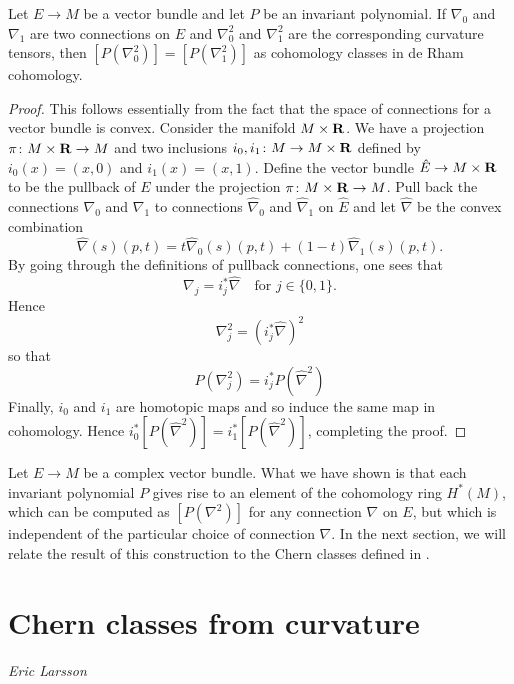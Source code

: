 \documentclass[a4paper,openany]{scrbook}
\newcommand{\chapterauthor}[1]{\hfill\emph{#1}\par\noindent}
\begin{document}
\begin{prop} \label{prop:p-curvature-derham}
Let $E \to M$ be a vector bundle and let $P$ be an invariant polynomial. If $\nabla_0$ and $\nabla_1$ are two connections on $E$ and $\nabla_0^2$ and $\nabla_1^2$ are the corresponding curvature tensors, then $[P(\nabla_0^2)] = [P(\nabla_1^2)]$ as cohomology classes in de Rham cohomology.
\begin{proof}
This follows essentially from the fact that the space of connections for a vector bundle is convex. Consider the manifold $M \times \mathbf R$. We have a projection $\pi \colon M \times \mathbf R \to M$ and two inclusions $i_0, i_1 \colon M \to M \times \mathbf R$ defined by $i_0(x) = (x, 0)$ and $i_1(x) = (x, 1)$.
Define the vector bundle $\hat E \to M \times \mathbf R$ to be the pullback of $E$ under the projection $\pi \colon M \times \mathbf R \to M$. Pull back the connections $\nabla_0$ and $\nabla_1$ to connections $\hat \nabla_0$ and $\hat \nabla_1$ on $\hat E$ and let $\hat \nabla$ be the convex combination
\[\hat \nabla(s)(p, t) = t \hat \nabla_0(s)(p, t) + (1-t) \hat \nabla_1(s)(p, t).\]
By going through the definitions of pullback connections, one sees that
\[\nabla_j = i_j^*\hat\nabla \quad \text{for } j \in \{0, 1\}.\]
Hence
\[\nabla_j^2 = (i_j^* \hat\nabla)^2\]
so that
\[P(\nabla_j^2) = i_j^* P(\hat \nabla^2)\]
Finally, $i_0$ and $i_1$ are homotopic maps and so induce the same map in cohomology. Hence $i_0^* [P(\hat \nabla^2)] = i_1^* [P(\hat \nabla^2)]$, completing the proof.
\end{proof}
\end{prop}

Let $E \to M$ be a complex vector bundle. What we have shown is that each invariant polynomial $P$ gives rise to an element of the cohomology ring $H^*(M)$, which can be computed as $[P(\nabla^2)]$ for any connection $\nabla$ on $E$, but which is independent of the particular choice of connection $\nabla$. In the next section, we will relate the result of this construction to the Chern classes defined in .

\section{Chern classes from curvature}
\chapterauthor{Eric Larsson}
\end{document}

